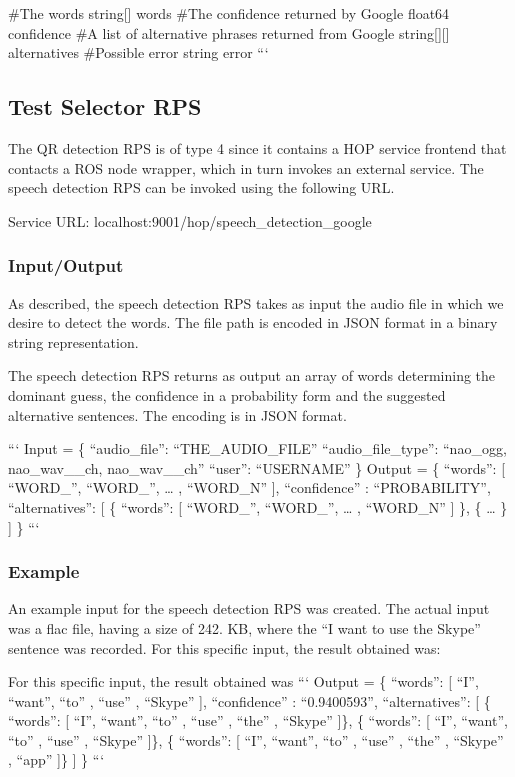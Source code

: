 \#\-The words string\mbox{[}\mbox{]} words \#\-The confidence returned by Google float64 confidence \#\-A list of alternative phrases returned from Google string\mbox{[}\mbox{]}\mbox{[}\mbox{]} alternatives \#\-Possible error string error ```

\subsection*{Test Selector R\-P\-S}

The Q\-R detection R\-P\-S is of type 4 since it contains a H\-O\-P service frontend that contacts a R\-O\-S node wrapper, which in turn invokes an external service. The speech detection R\-P\-S can be invoked using the following U\-R\-L.

Service U\-R\-L\-: {\ttfamily localhost\-:9001/hop/speech\-\_\-detection\-\_\-google}

\subsubsection*{Input/\-Output}

As described, the speech detection R\-P\-S takes as input the audio file in which we desire to detect the words. The file path is encoded in J\-S\-O\-N format in a binary string representation.

The speech detection R\-P\-S returns as output an array of words determining the dominant guess, the confidence in a probability form and the suggested alternative sentences. The encoding is in J\-S\-O\-N format.

``` Input = \{ “audio\-\_\-file”\-: “\-T\-H\-E\-\_\-\-A\-U\-D\-I\-O\-\_\-\-F\-I\-L\-E” “audio\-\_\-file\-\_\-type”\-: “nao\-\_\-ogg, nao\-\_\-wav\-\_\-\_\-ch, nao\-\_\-wav\-\_\-\_\-ch” “user”\-: “\-U\-S\-E\-R\-N\-A\-M\-E” \} {\ttfamily  } Output = \{ “words”\-: \mbox{[} “\-W\-O\-R\-D\-\_”, “\-W\-O\-R\-D\-\_”, … , “\-W\-O\-R\-D\-\_\-\-N” \mbox{]}, “confidence” \-: “\-P\-R\-O\-B\-A\-B\-I\-L\-I\-T\-Y”, “alternatives”\-: \mbox{[} \{ “words”\-: \mbox{[} “\-W\-O\-R\-D\-\_”, “\-W\-O\-R\-D\-\_”, … , “\-W\-O\-R\-D\-\_\-\-N” \mbox{]} \}, \{ … \} \mbox{]} \} ``` \subsubsection*{Example}

An example input for the speech detection R\-P\-S was created. The actual input was a flac file, having a size of 242. K\-B, where the “\-I want to use the Skype” sentence was recorded. For this specific input, the result obtained was\-:

For this specific input, the result obtained was ``` Output = \{ “words”\-: \mbox{[} “\-I”, “want”, “to” , “use” , “\-Skype” \mbox{]}, “confidence” \-: “0.9400593”, “alternatives”\-: \mbox{[} \{ “words”\-: \mbox{[} “\-I”, “want”, “to” , “use” , “the” , “\-Skype” \mbox{]}\}, \{ “words”\-: \mbox{[} “\-I”, “want”, “to” , “use” , “\-Skype” \mbox{]}\}, \{ “words”\-: \mbox{[} “\-I”, “want”, “to” , “use” , “the” , “\-Skype” , “app” \mbox{]}\} \mbox{]} \} ``` 
